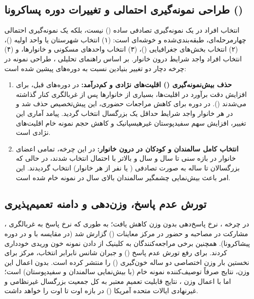\documentclass[12pt]{exam}
\begin{document}
\subsection{طراحی نمونه‌گیری احتمالی و تغییرات دوره پساکرونا ()}
انتخاب افراد در  یک نمونه‌گیری تصادفی ساده () نیست، بلکه یک نمونه‌گیری احتمالی چهارمرحله‌ای، طبقه‌بندی‌شده و خوشه‌ای است: (۱) انتخاب  شهرستان یا واحد اولیه ()، (۲) انتخاب بخش‌های جغرافیایی ()، (۳) انتخاب واحدهای مسکونی و خانوارها، و (۴) انتخاب افراد واجد شرایط درون خانوار. بر اساس راهنمای تحلیلی ، طراحی نمونه در چرخه  دچار دو تغییر بنیادین نسبت به دوره‌های پیشین شده است:
\begin{enumerate}
\item \textbf{حذف بیش‌نمونه‌گیری () اقلیت‌های نژادی و کم‌درآمد:} در دوره‌های قبل، برای افزایش دقت برآورد در اقلیت‌ها، بسیاری از خانوارها پس از غربالگری کنار گذاشته می‌شدند (). در دوره  برای کاهش مراجعات حضوری، این پیش‌تخصیص حذف شد و در هر خانوار واجد شرایط حداقل یک بزرگسال انتخاب گردید. پیامد آماری این تغییر، افزایش سهم سفیدپوستان غیرهیسپانیک و کاهش حجم نمونه خام اقلیت‌های نژادی است.
\item \textbf{انتخاب کامل سالمندان و کودکان در درون خانوار:} در این چرخه، تمامی اعضای خانوار در بازه سنی  تا  سال و  سال و بالاتر با احتمال  انتخاب شدند، در حالی که بزرگسالان  تا  ساله به صورت تصادفی ( یا  نفر از هر خانوار) انتخاب گردیدند. این امر باعث بیش‌نمایی چشمگیر سالمندان بالای  سال در نمونه خام شده است.
\end{enumerate}

\subsection{تورش عدم پاسخ، وزن‌دهی و دامنه تعمیم‌پذیری}
در چرخه ، نرخ پاسخ‌دهی بدون وزن کاهش یافت؛ به طوری که نرخ پاسخ به غربالگری ، مشارکت در مصاحبه  و حضور در مرکز معاینات ()  گزارش شد (در مقایسه با  و  در دوره پیشاکرونا). همچنین برخی مراجعه‌کنندگان به کلینیک از دادن نمونه خون وریدی خودداری کردند. برای رفع تورش عدم پاسخ () و جبران شانس نابرابر انتخاب، مرکز  برای نخستین بار وزن اختصاصی دو ساله خون‌گیری () را منتشر کرده است. بدون اعمال این وزن، نتایج صرفاً توصیف‌کننده نمونه خام (با بیش‌نمایی سالمندان و سفیدپوستان) است؛ اما با اعمال وزن ، نتایج قابلیت تعمیم معتبر به کل جمعیت بزرگسال غیرنظامی و غیرنهادی ایالات متحده آمریکا () در بازه اوت  تا اوت  را خواهد داشت.
\end{document}
